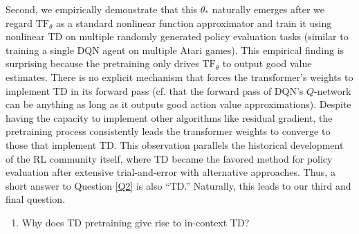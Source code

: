\documentclass{article}
\newcommand{\ehb}[1]{({\color{violet} {Ethan: #1}})}
\newcommand{\tf}{\text{TF}}
\begin{document}
Second, we empirically demonstrate that this $\theta_*$ naturally emerges after we regard $\tf_\theta$ as a standard nonlinear function approximator and train it using nonlinear TD on multiple randomly generated policy evaluation tasks (similar to training a single DQN agent on multiple Atari games).
This empirical finding is surprising because the pretraining only drives $\tf_\theta$ to output good value estimates.
There is no explicit mechanism that forces the transformer's weights to
implement TD in its forward pass (cf. that the forward pass of DQN's $Q$-network can be anything as long as it outputs good action value approximations). 
Despite having the capacity to implement other algorithms like residual gradient, the pretraining process consistently leads the transformer weights to converge to those that implement TD.
This observation parallels the historical development of the RL community itself, where TD became the favored method for policy evaluation after extensive trial-and-error with alternative approaches.
Thus, a short answer to Question \ref{Q2} is also ``TD.''
Naturally, this leads to our third and final question.
\begin{enumerate}[topsep=0pt,itemsep=-1ex,partopsep=1ex,parsep=1ex, start=3, label={ (Q\arabic*)}]
    \item Why does TD pretraining give rise to in-context TD? \label{Q3}
\end{enumerate}
\end{document}

